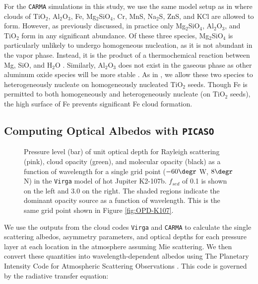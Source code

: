 \documentclass[twocolumn]{aastex63}
\begin{document}
For the \texttt{CARMA} simulations in this study, we use the same model setup as in \citet{gao2020} where clouds of TiO$_2$, Al$_2$O$_3$, Fe, Mg$_2$SiO$_4$, Cr, MnS, Na$_2$S, ZnS, and KCl are allowed to form. However, as previously discussed, in practice only Mg$_2$SiO$_4$, Al$_2$O$_3$, and TiO$_2$ form in any significant abundance. Of these three species, Mg$_2$SiO$_4$ is particularly unlikely to undergo homogeneous nucleation, as it is not abundant in the vapor phase. Instead, it is the product of a thermochemical reaction between Mg, SiO, and H$_2$O \citep[e.g.][]{Visscher_2010}. Similarly, Al$_2$O$_3$ does not exist in the gaseous phase as other aluminum oxide species will be more stable \citep[e.g.][]{patzer2005}. As in \citet{gao2020}, we allow these two species to heterogeneously nucleate on homogeneously nucleated TiO$_2$ seeds. Though Fe is permitted to both homogeneously and heterogeneously nucleate (on TiO$_2$ seeds), the high surface of Fe prevents significant Fe cloud formation. 
 

\subsection{Computing Optical Albedos with \texttt{PICASO}}\label{sec:picaso}


\begin{figure*}[!tbp]
\centering
{}
\hfill
{}
\caption{Pressure level (bar) of unit optical depth for Rayleigh scattering (pink), cloud opacity (green), and molecular opacity (black) as a function of wavelength for a single grid point ($-60\degr$ W, $8\degr$ N) in the \texttt{Virga} model of hot Jupiter K2-107b. $f_{sed}$ of 0.1 is shown on the left and 3.0 on the right. The shaded regions indicate the dominant opacity source as a function of wavelength. This is the same grid point shown in Figure \ref{fig:OPD-K107}.
\label{fig:opacity_fsed}}
\end{figure*}

 We use the outputs from the cloud codes \texttt{Virga} and \texttt{CARMA} to calculate the single scattering albedos, asymmetry parameters, and optical depths for each pressure layer at each location in the atmosphere assuming Mie scattering. We then convert these quantities into wavelength-dependent albedos using The Planetary Intensity Code for Atmospheric Scattering Observations \citep[\texttt{PICASO;}][]{picaso}.  This code is  governed by the radiative transfer equation:
 
\end{document}
